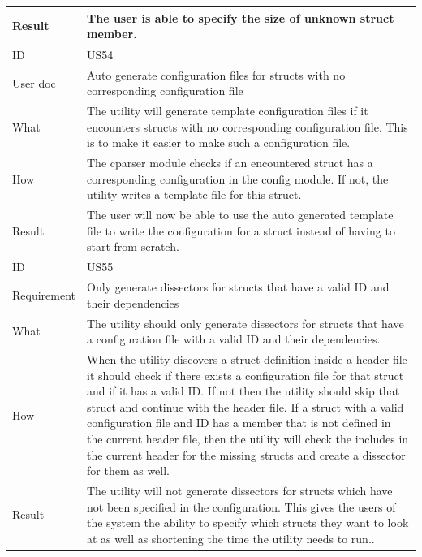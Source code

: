 \begin{table}[htbp]
{\begin{tabularx}{1.2\textwidth}{l X}
	Result & The user is able to specify the size of unknown struct member. \\	
	\midrule
	ID & US54 \\
	User doc & Auto generate configuration files for structs with no corresponding configuration file \\
	What & The utility will generate template configuration files if it encounters structs with no corresponding configuration file. This is to make it easier to make such a configuration file.   \\
	How & The cparser module checks if an encountered struct has a corresponding configuration in the config module. If not, the utility writes a template file for this struct.   \\
	Result & The user will now be able to use the auto generated template file to write the configuration for a struct instead of having to start from scratch. \\
	\midrule
	ID & US55 \\
	Requirement & Only generate dissectors for structs that have a valid ID and their dependencies \\
	What & The utility should only generate dissectors for structs that have a configuration file with a valid ID and their dependencies.    \\
	How & When the utility discovers a struct definition inside a header file it should check if there exists a configuration file for that struct and if it has a valid ID.
	If not then the utility should skip that struct and continue with the header file. If a struct with a valid configuration file and ID has a member that is not defined in the current header
	file, then the utility will check the includes in the current header for the missing structs and create a dissector for them as well.\\
	Result & The utility will not generate dissectors for structs which have not been specified in the configuration.
	This gives the users of the system the ability to specify which structs they want to look at as well as shortening the time the utility needs to run.. \\
	\bottomrule
\end{tabularx}}
\end{table}

